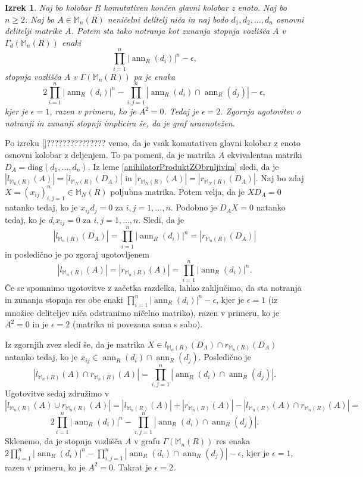 \documentclass[a4paper, 12pt]{amsart}
\theoremstyle{definition} %
\theoremstyle{plain} %
\newtheorem{izrek}[definicija]{Izrek}
\newcommand{\M}{\mathbb M}
\DeclareMathOperator{\ann}{ann}
\begin{document}
\begin{izrek}
\label{inDegreeOutDegree}
Naj bo kolobar $R$ komutativen končen glavni kolobar z enoto. Naj bo $n \ge 2$. Naj bo $A\in \M_n(R)$ neničelni delitelj niča in naj bodo $d_1,d_2, \dots,d_n$ osnovni delitelji matrike $A$. Potem sta tako notranja kot zunanja stopnja vozlišča $A$ v $\Gamma_d(\M_n(R))$ enaki
$$
\prod_{i=1}^n |\ann_R(d_i)|^n - \epsilon,
$$ 
stopnja vozlišča $A$ v $\Gamma(\M_n(R))$ pa je enaka
$$
2\prod_{i=1}^n |\ann_R(d_i)|^n - \prod_{i,j=1}^n |\ann_R(d_i) \cap \ann_R(d_j)| - \epsilon,
$$
kjer je $\epsilon =1$, razen v primeru, ko je $A^2 = 0$. Tedaj je $\epsilon = 2$. Zgornja ugotovitev o notranji in zunanji stopnji implicira še, da je graf uravnotežen.
\end{izrek}

\proof
Po izreku  \ref{}??????????????? vemo, da je vsak komutativen glavni kolobar z enoto osnovni kolobar z deljenjem. To pa pomeni, da je matrika $A$ ekvivalentna matriki $D_A= \text{diag}(d_1,\dots,d_n)$. Iz leme \ref{anihilatorProduktZObrnljivim} sledi, da je $|l_{\M_n(R)}(A)| = |l_{\M_N(R)}(D_A)|$ in $|r_{\M_N(R)}(A)| = |r_{\M_N(R)}(D_A)|$. Naj bo zdaj $X=(x_{ij})_{i,j=1}^n\in \M_N(R)$ poljubna matrika. Potem velja, da je $XD_A = 0$ natanko tedaj, ko je $x_{ij}d_j = 0$ za $i,j = 1, \dots, n$. Podobno je $D_AX = 0$ natanko tedaj, ko je $d_i x_{ij} =0 $ za $i,j=1,\dots,n$. Sledi, da je 
$$
|l_{\M_n(R)}(D_A)| = \prod_{i=1}^n |\ann_R(d_i)|^n = |r_{\M_n(R)}(D_A)|
$$
in posledično je po zgoraj ugotovljenem
$$
|l_{\M_n(R)}(A)|= |r_{\M_n(R)}(A)| = \prod_{i=1}^n |\ann_R(d_i)|^n .
$$
Če se spomnimo ugotovitve z začetka razdelka, lahko zaključimo, da sta notranja in zunanja stopnja res obe enaki $\prod_{i=1}^n  |\ann_R(d_i)|^n - \epsilon$, kjer je $\epsilon = 1$ (iz množice deliteljev niča odstranimo ničelno matriko), razen v primeru, ko je $A^2 = 0$ in je $\epsilon = 2$ (matrika ni povezana sama s sabo). 

Iz zgornjih zvez sledi še, da je matrika $X\in l_{\M_n(R)}(D_A)\cap r_{\M_n(R)}(D_A)$ natanko tedaj, ko je $x_{ij} \in  \ann_R(d_i)\cap \ann_R(d_j)$. Posledično je 
$$
|l_{\M_n(R)}(A) \cap r_{\M_n(R)}(A)| = \prod_{i,j=1}^n | \ann_R(d_i) \cap \ann_R(d_j)|.
$$
Ugotovitve sedaj združimo v 
$$
|l_{\M_n(R)}(A) \cup r_{\M_n(R)}(A)| = |l_{\M_n(R)}(A)|  + |r_{\M_n(R)}(A)| - |l_{\M_n(R)}(A) \cap r_{\M_n(R)}(A)|=
$$
$$
2\prod_{i=1}^n |\ann_R(d_i)|^n - \prod_{i,j=1}^n |\ann_R(d_i) \cap \ann_R(d_j)|.
$$
Sklenemo, da je stopnja vozlišča $A$ v grafu $\Gamma(\M_n(R))$ res enaka $2\prod_{i=1}^n |\ann_R(d_i)|^n - \prod_{i,j=1}^n |\ann_R(d_i) \cap \ann_R(d_j)| -\epsilon$, kjer je $\epsilon=1$, razen v primeru, ko je $A^2 = 0$. Takrat je $\epsilon=2$.
\endproof
\end{document}

